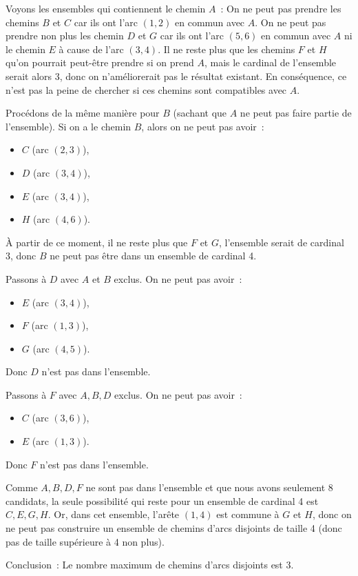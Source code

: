\documentclass{article}
\begin{document}
Voyons les ensembles qui contiennent le chemin $A$~: On ne peut pas
prendre les chemins $B$ et $C$ car ils ont l'arc $(1,2)$ en commun
avec $A$. On ne peut pas prendre non plus les chemin $D$ et $G$ car
ils ont l'arc $(5,6)$ en commun avec $A$ ni le chemin $E$ à cause de
l'arc $(3,4)$. Il ne reste plus que les chemins $F$ et $H$ qu'on
pourrait peut-être prendre si on prend $A$, mais le cardinal de
l'ensemble serait alors 3, donc on n'améliorerait pas le résultat
existant. En conséquence, ce n'est pas la peine de chercher si ces chemins
sont \og compatibles\fg{} avec $A$.

Procédons de la même manière pour $B$ (sachant que $A$ ne peut pas
faire partie de l'ensemble). Si on a le chemin $B$, alors on ne peut
pas avoir~:
\begin{itemize}
  \item $C$ (arc $(2,3)$),
  \item $D$ (arc $(3,4)$),
  \item $E$ (arc $(3,4)$),
  \item $H$ (arc $(4,6)$).
\end{itemize}
À partir de ce moment, il ne reste plus que $F$ et $G$, l'ensemble
serait de cardinal 3, donc $B$ ne peut pas être dans un ensemble de
cardinal 4.

Passons à $D$ avec $A$ et $B$ exclus. On ne peut pas avoir~:
\begin{itemize}
\item $E$ (arc $(3,4)$),
\item $F$ (arc $(1,3)$),
\item $G$ (arc $(4,5)$).
\end{itemize}
Donc $D$ n'est pas dans l'ensemble.

Passons à $F$ avec $A,B,D$ exclus. On ne peut pas avoir~:
\begin{itemize}
\item $C$ (arc $(3,6)$),
\item $E$ (arc $(1,3)$).
\end{itemize}
Donc $F$ n'est pas dans l'ensemble.

Comme $A,B,D,F$ ne sont pas dans l'ensemble et que nous avons
seulement 8 candidats, la seule possibilité qui reste pour un ensemble
de cardinal 4 est $C,E,G,H$. Or, dans cet ensemble, l'arête $(1,4)$
est commune à $G$ et $H$, donc on ne peut pas construire un ensemble
de chemins d'arcs disjoints de taille 4 (donc pas de taille supérieure
à 4 non plus).

Conclusion~: Le nombre maximum de chemins d'arcs disjoints est 3.
\end{document}
